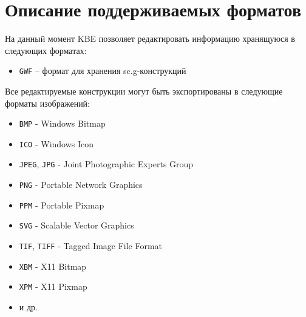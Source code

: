 \section{Описание поддерживаемых форматов}

На данный момент KBE позволяет редактировать информацию хранящуюся в следующих форматах:
\begin{itemize}
	\item {\tt GWF} – формат для хранения sc.g-конструкций
\end{itemize}

Все редактируемые конструкции могут быть экспортированы в следующие форматы изображений:
\begin{itemize}
	\item {\tt BMP} - Windows Bitmap
	\item {\tt ICO} - Windows Icon
	\item {\tt JPEG}, {\tt JPG} - Joint Photographic Experts Group
	\item {\tt PNG} - Portable Network Graphics
	\item {\tt PPM} - Portable Pixmap
	\item {\tt SVG} - Scalable Vector Graphics
	\item {\tt TIF}, {\tt TIFF} - Tagged Image File Format
	\item {\tt XBM} - X11 Bitmap
	\item {\tt XPM} - X11 Pixmap
	\item и др.
\end{itemize}
